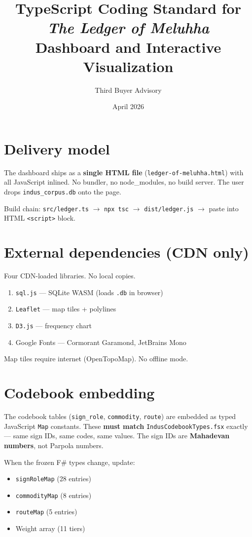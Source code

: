 \documentclass[11pt]{article}
\title{\textbf{TypeScript Coding Standard for \textit{The Ledger of Meluhha}}\\
  \large Dashboard and Interactive Visualization}
\author{Third Buyer Advisory}
\date{April 2026}
\begin{document}
\maketitle

\section{Delivery model}

The dashboard ships as a \textbf{single HTML file}
(\texttt{ledger-of-meluhha.html}) with all JavaScript inlined.
No bundler, no node\_modules, no build server.
The user drops \texttt{indus\_corpus.db} onto the page.

Build chain: \texttt{src/ledger.ts} $\to$ \texttt{npx tsc}
$\to$ \texttt{dist/ledger.js} $\to$ paste into HTML
\texttt{<script>} block.

\section{External dependencies (CDN only)}

Four CDN-loaded libraries. No local copies.

\begin{enumerate}[nosep]
\item \texttt{sql.js} --- SQLite WASM (loads \texttt{.db} in browser)
\item \texttt{Leaflet} --- map tiles + polylines
\item \texttt{D3.js} --- frequency chart
\item Google Fonts --- Cormorant Garamond, JetBrains Mono
\end{enumerate}

Map tiles require internet (OpenTopoMap). No offline mode.

\section{Codebook embedding}

The codebook tables (\texttt{sign\_role}, \texttt{commodity},
\texttt{route}) are embedded as typed JavaScript \texttt{Map}
constants. These \textbf{must match}
\texttt{IndusCodebookTypes.fsx} exactly --- same sign IDs,
same codes, same values. The sign IDs are \textbf{Mahadevan
numbers}, not Parpola numbers.

When the frozen F\# types change, update:
\begin{itemize}[nosep]
\item \texttt{signRoleMap} (28 entries)
\item \texttt{commodityMap} (8 entries)
\item \texttt{routeMap} (5 entries)
\item Weight array (11 tiers)
\end{itemize}
\end{document}
